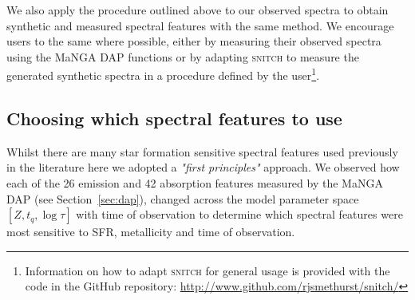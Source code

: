 \documentclass[useAMS,usenatbib]{mn2e}
\begin{document}
We also apply the procedure outlined above to our observed spectra to obtain synthetic and measured spectral features with the same method. We encourage users to the same where possible, either by measuring their observed spectra using the MaNGA DAP functions or by adapting \textsc{snitch} to measure the generated synthetic spectra in a procedure defined by the user\footnote{Information on how to adapt \textsc{snitch} for general usage is provided with the code in the GitHub repository: \url{http://www.github.com/rjsmethurst/snitch/}}.

\subsection{Choosing which spectral features to use}\label{sec:choosespf}

Whilst there are many star formation sensitive spectral features used previously in the literature \citep[see comprehensive review by][]{kennevans12} here we adopted a \emph{"first principles"} approach. We observed how each of the 26 emission and 42 absorption features measured by the MaNGA DAP (see Section~\ref{sec:dap}), changed across the model parameter space $[Z, t_q, \log \tau]$ with time of observation to determine which spectral features were most sensitive to SFR, metallicity and time of observation. 
\end{document}
